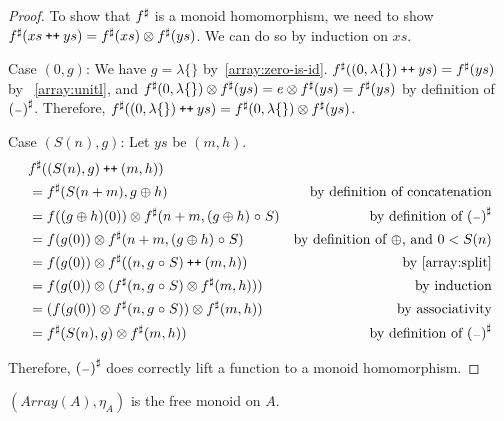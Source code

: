 \begin{proof}
    To show that ${f}^{\sharp}$ is a monoid homomorphism,
    we need to show ${f}^{\sharp}(xs \mathbin{\text{\ttfamily\upshape ++}} ys) = {f}^{\sharp}(xs) \otimes {f}^{\sharp}(ys)$.
    We can do so by induction on $xs$.

    Case $(0, g)$:
    We have $g = \lambda\{\}$ by~\ref{array:zero-is-id}.
    ${f}^{\sharp}((0, \lambda\{\}) \mathbin{\text{\ttfamily\upshape ++}} ys) = {f}^{\sharp}(ys)$ by ~\ref{array:unitl},
    and ${f}^{\sharp}(0, \lambda\{\}) \otimes {f}^{\sharp}(ys) = e \otimes {f}^{\sharp}(ys) = {f}^{\sharp}(ys)$
    by definition of ${({\scriptstyle{-}})}^{\sharp}$. Therefore,
    ${f}^{\sharp}((0, \lambda\{\}) \mathbin{\text{\ttfamily\upshape ++}} ys) = {f}^{\sharp}(0, \lambda\{\}) \otimes {f}^{\sharp}(ys)$.

    Case $(S(n), g)$: Let $ys$ be $(m, h)$.
    \begin{align*}
       & {f}^{\sharp}((S(n), g) \mathbin{\text{\ttfamily\upshape ++}} (m, h)) \\
       & = {f}^{\sharp}(S(n + m), g \oplus h) & \text{by definition of concatenation} \\
       & = f((g \oplus h)(0)) \otimes {f}^{\sharp}(n + m, (g \oplus h) \mathrel{\circ} S) & \text{by definition of ${({\scriptstyle{-}})}^{\sharp}$} \\
       & = f(g(0)) \otimes {f}^{\sharp}(n + m, (g \oplus h) \mathrel{\circ} S) & \text{by definition of $\oplus$, and $0 < S(n)$} \\
       & = f(g(0)) \otimes {f}^{\sharp}((n, g \mathrel{\circ} S) \mathbin{\text{\ttfamily\upshape ++}} (m, h)) & \text{by~\ref{array:split}} \\
       & = f(g(0)) \otimes ({f}^{\sharp}(n, g \mathrel{\circ} S) \otimes {f}^{\sharp}(m, h))) & \text{by induction} \\
       & = (f(g(0)) \otimes {f}^{\sharp}(n, g \mathrel{\circ} S)) \otimes {f}^{\sharp}(m, h)) & \text{by associativity} \\
       & = {f}^{\sharp}(S(n), g) \otimes {f}^{\sharp}(m, h)) & \text{by definition of ${({\scriptstyle{-}})}^{\sharp}$} \\
    \end{align*}

    Therefore, ${({\scriptstyle{-}})}^{\sharp}$ does correctly lift a function to a monoid homomorphism.
\end{proof}

\begin{proposition}
    $(Array(A),\eta_A)$ is the free monoid on $A$.
\end{proposition}

